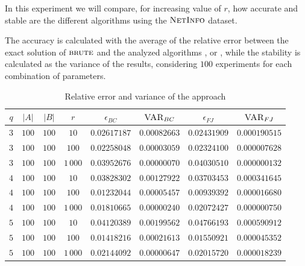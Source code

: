 In this experiment we will compare, for increasing value of $r$, how accurate and stable are the different algorithms using the $\textsc{NetInfo}$ dataset.\medskip

The accuracy is calculated with the average of the relative error between the exact solution of $\textsc{brute}$ and the analyzed algorithms \fcount, \fsamp or \base, while the stability is calculated as the variance of the results, considering $100$ experiments for each combination of parameters.

\begin{table}[h]
	\centering
	\begin{tabular}{|c|c|c|c|c|c|c|c|}
		\hline
		$q$ & $|A|$ & $|B|$ & $r$      & $\epsilon_{BC}$ & $\textsc{VAR}_{BC}$ & $\epsilon_{FJ}$ & $\textsc{VAR}_{FJ}$ \\ \hline \hline
		$3$ & $100$ & $100$ & $10$     & $0.02617187$    & $0.00082663$        & $0.02431909$    & $0.000190515$       \\ \hline
		$3$ & $100$ & $100$ & $100$    & $0.02258048$    & $0.00003059$        & $0.02324100$    & $0.000007628$       \\ \hline
		$3$ & $100$ & $100$ & $1\,000$ & $0.03952676$    & $0.00000070$        & $0.04030510$    & $0.000000132$       \\ \hline \hline
		$4$ & $100$ & $100$ & $10$     & $0.03828302$    & $0.00127922$        & $0.03703453$    & $0.000341645$       \\ \hline
		$4$ & $100$ & $100$ & $100$    & $0.01232044$    & $0.00005457$        & $0.00939392$    & $0.000016680$       \\ \hline
		$4$ & $100$ & $100$ & $1\,000$ & $0.01810665$    & $0.00000240$        & $0.02072427$    & $0.000000750$       \\ \hline \hline
		$5$ & $100$ & $100$ & $10$     & $0.04120389$    & $0.00199562$        & $0.04766193$    & $0.000590912$       \\ \hline
		$5$ & $100$ & $100$ & $100$    & $0.01418216$    & $0.00021613$        & $0.01550921$    & $0.000045352$       \\ \hline
		$5$ & $100$ & $100$ & $1\,000$ & $0.02144092$    & $0.00000647$        & $0.02015720$    & $0.000018239$       \\ \hline
		
	\end{tabular}
	\caption{Relative error and variance of the \fcount approach}	
\end{table}

